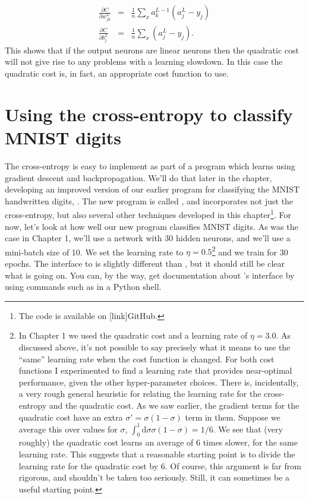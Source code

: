 \documentclass[a4paper,twoside,10pt]{book}
\begin{document}
\begin{itemize}
	\begin{eqnarray}
	\frac{\partial C}{\partial w^L_{jk}} & = & \frac{1}{n} \sum_x a^{L-1}_k  (a^L_j-y_j)\\
	\frac{\partial C}{\partial b^L_{j}} & = & \frac{1}{n} \sum_x (a^L_j-y_j).
	\label{eq:70}
	\end{eqnarray}
	This shows that if the output neurons are linear neurons then the quadratic cost will not give rise to any problems with a learning slowdown. In this case the quadratic cost is, in fact, an appropriate cost function to use.
\end{itemize}
\section{Using the cross-entropy to classify MNIST digits}
The cross-entropy is easy to implement as part of a program which learns using gradient descent and backpropagation. We'll do that later in the chapter, developing an improved version of our earlier program for classifying the MNIST handwritten digits, . The new program is called , and incorporates not just the cross-entropy, but also several other techniques developed in this chapter\footnote{The code is available on [link]GitHub.}. For now, let's look at how well our new program classifies MNIST digits. As was the case in Chapter 1, we'll use a network with 30 hidden neurons, and we'll use a mini-batch size of 10. We set the learning rate to $\eta=0.5$\footnote{In Chapter 1 we used the quadratic cost and a learning rate of $\eta=3.0$. As discussed above, it's not possible to say precisely what it means to use the ``same'' learning rate when the cost function is changed. For both cost functions I experimented to find a learning rate that provides near-optimal performance, given the other hyper-parameter choices. \newline There is, incidentally, a very rough general heuristic for relating the learning rate for the cross-entropy and the quadratic cost. As we saw earlier, the gradient terms for the quadratic cost have an extra $\sigma' = \sigma(1-\sigma)$ term in them. Suppose we average this over values for $\sigma$, $\int_0^1\mathrm{d}\sigma \sigma(1-\sigma)=1/6$. We see that (very roughly) the quadratic cost learns an average of 6 times slower, for the same learning rate. This suggests that a reasonable starting point is to divide the learning rate for the quadratic cost by 6. Of course, this argument is far from rigorous, and shouldn't be taken too seriously. Still, it can sometimes be a useful starting point.} and we train for 30 epochs. The interface to  is slightly different than , but it should still be clear what is going on. You can, by the way, get documentation about 's interface by using commands such as  in a Python shell.
\end{document}
